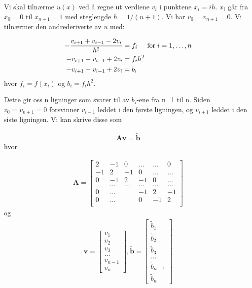 \documentclass[reprint,english,notitlepage]{revtex4-1}
\begin{document}
	Vi skal tilnærme $u(x)$ ved å regne ut verdiene $v_i$ i punktene $x_i = ih$. $x_i$ går fra $x_0 = 0$ til $x_{n+1} = 1$ med steglengde $h=1/(n+1)$. Vi har $v_0 = v_{n+1} = 0$. Vi tilnærmer den andrederiverte av $u$ med:
	
	\begin{equation*}
	\begin{aligned}
	-\frac{v_{i+1}+v_{i-1}-2v_i}{h^2} &= f_i  \hspace{0.5cm} \mathrm{for} \hspace{0.1cm} i=1,\dots, n \\
	-v_{i+1} - v_{i-1} + 2v_i &= f_i h^2 \\
	-v_{i+1} - v_{i-1} + 2v_i &= b_i
	\end{aligned}
	\end{equation*}
	hvor $f_i=f(x_i)$ og $b_i = f_i h^2$.
	
	Dette gir oss n ligninger som svarer til av $b_i$-ene fra n=1 til n. Siden $v_0 = v_{n+1} = 0$ forsvinner $v_{i-1}$ leddet i den første ligningen, og $v_{i+1}$ leddet i den siste ligningen. Vi kan skrive disse som
	
	\begin{equation*}
	\begin{aligned}
	\mathbf{A}\mathbf{v} = \tilde{\mathbf{b}}
	\end{aligned}
	\end{equation*}
	hvor

	\begin{equation*}
	\begin{aligned}
	\mathbf{A} = \begin{bmatrix}
	2& -1& 0 &\dots   & \dots &0 \\
	-1 & 2 & -1 &0 &\dots &\dots \\
	0&-1 &2 & -1 & 0 & \dots \\
	& \dots   & \dots &\dots   &\dots & \dots \\
	0&\dots   &  &-1 &2& -1 \\
	0&\dots    &  & 0  &-1 & 2 \\
	\end{bmatrix}
	\end{aligned}
	\end{equation*}
	og 
	\begin{equation*}
	\begin{aligned}
	\mathbf{v} = \begin{bmatrix}
	v_1 \\
	v_2 \\
	v_3 \\
	\dots \\
	v_{n-1} \\
	v_{n}
	\end{bmatrix},
	\tilde{\mathbf{b}} = \begin{bmatrix}
	\tilde{b}_1 \\
	\tilde{b}_2 \\
	\tilde{b}_3 \\
	\dots \\
	\tilde{b}_{n-1} \\
	\tilde{b}_{n}
	\end{bmatrix}
	\end{aligned}
	\end{equation*}
\end{document}
